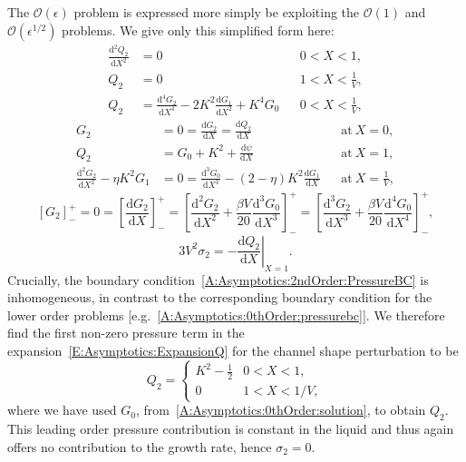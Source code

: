\documentclass{jfm}
\newcommand{\dd}[2]{\frac{\mathrm{d} #1}{\mathrm{d} #2}}
\newcommand{\poisson}{\eta} %
\begin{document}
The  $\mathcal{O}(\epsilon)$ problem is expressed more simply be exploiting the $\mathcal{O}(1)$ and $\mathcal{O}(\epsilon^{1/2})$ problems. We give only this simplified form here:
\begin{align}
 \dd{^2 Q_2}{X^2}&=0 & &0 < X<1,\\
Q_2 &= 0 & &1 < X< \frac{1}{V},\\
Q_2 &= \dd{^4 G_2}{X^4} - 2K^2\dd{G_1}{X^2}+ K^4 G_0 & & 0 < X < \frac{1}{V},
\end{align}
\begin{align}
G_2 &= 0 = \dd{G_2}{X}= \dd{Q_2}{X} & &\text{at}~X = 0,\\
Q_2 &=G_0+ K^2+ \dd{\psi}{X} & &\text{at}~X = 1,\label{A:Asymptotics:2ndOrder:PressureBC}\\
\dd{^2 G_2}{X^2} - \poisson K^2 G_1 &=0 = \dd{^3 G_0}{X^3}  - (2- \poisson)K^2 \dd{G_1}{X}& &\text{at}~X = \frac{1}{V},
\end{align}
\begin{equation}
\left[G_2\right]_-^+ =0 = \left[\dd{G_2}{X}\right]_-^+ = \left[\dd{^2 G_2}{X^2} + \frac{\beta V}{20}\dd{^3G_0}{X^3}\right]_-^+ = \left[\dd{^3 G_2}{X^3} + \frac{\beta V}{20}\dd{^4 G_0}{X^4}\right]_-^+,
\end{equation}
\begin{equation}
3V^2 \sigma_2 = -\left.\dd{Q_2}{X}\right|_{X=1}.
\end{equation}
Crucially, the boundary condition~\eqref{A:Asymptotics:2ndOrder:PressureBC} is inhomogeneous, in contrast to the corresponding boundary condition for the lower order problems [e.g.~\eqref{A:Asymptotics:0thOrder:pressurebc}]. We therefore find the first non-zero pressure term in the expansion~\eqref{E:Asymptotics:ExpansionQ} for the channel shape perturbation to be
\begin{equation}\label{A:Asymptotics:2ndOrder:solQ2}
Q_2 = \begin{cases}
K^2 - \frac{1}{2} & 0 <X  < 1,\\
0 & 1 < X < 1/V,
\end{cases}
\end{equation}
where we have used $G_0$, from~\eqref{A:Asymptotics:0thOrder:solution}, to obtain $Q_2$. This leading order pressure contribution is constant in the liquid and thus again offers no contribution to the growth rate, hence $\sigma_2 = 0$.
\end{document}
